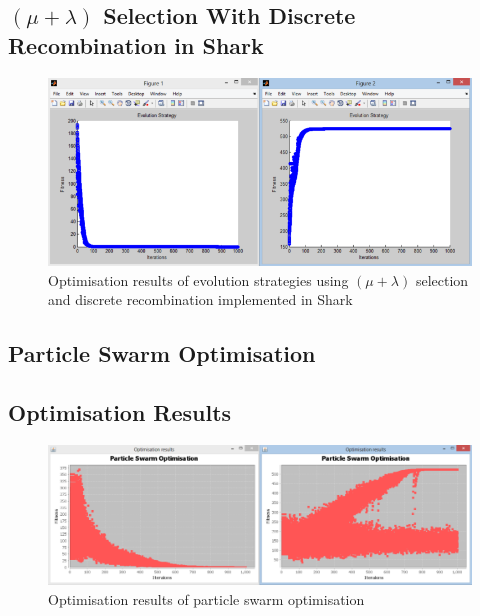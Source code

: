 \begin{landscape}
\subsection{$(\mu+\lambda)$ Selection With Discrete Recombination in Shark}
\label{sec:appendix19}
  \begin{figure}[h]
    \begin{center}
      \includegraphics{Figures/sharkes}
    \end{center}
    \caption{Optimisation results of evolution strategies using $(\mu+\lambda)$ selection and discrete recombination implemented in Shark}
    \label{fig:phase1}
  \end{figure}
\end{landscape}

\begin{landscape}
\section{Particle Swarm Optimisation}
\subsection{Optimisation Results}
\label{sec:appendix20}
  \begin{figure}[h]
    \begin{center}
      \includegraphics{Figures/pso}
    \end{center}
    \caption{Optimisation results of particle swarm optimisation}
    \label{fig:phase1}
  \end{figure}
\end{landscape}

